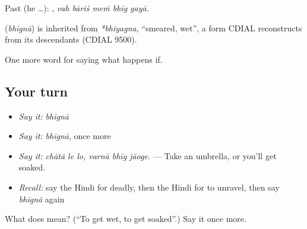 Past (he …):     , \emph{vah bāriś meṁ bhīg gayā}.

\begin{cousinweb}
\textbf{} (\emph{bhīgnā}) is inherited from \emph{*bhiyagna}, \textquotedblleft{}smeared, wet\textquotedblright{}, a form CDIAL reconstructs from its descendants (CDIAL 9500).
\end{cousinweb}

\begin{grammarlens}[title={What you've built}]
One more word for saying what happens if.
\end{grammarlens}

\subsection*{Your turn}
\begin{itemize}
\raggedright
  \item \emph{Say it:} \emph{bhīgnā}
  \item \emph{Say it:} \emph{bhīgnā}, once more
  \item \emph{Say it:} \emph{chātā le lo, varnā bhīg jāoge.} — Take an umbrella, or you'll get soaked.
  \item \emph{Recall:} say the Hindi for deadly, then the Hindi for to unravel, then say \emph{bhīgnā} again
\end{itemize}

\begin{tcolorbox}[breakable,colback=teal!4,colframe=teal!35!black,title={Before you move on}]
What does  mean? (\textquotedblleft{}To get wet, to get soaked\textquotedblright{}.) Say it once more.
\end{tcolorbox}
